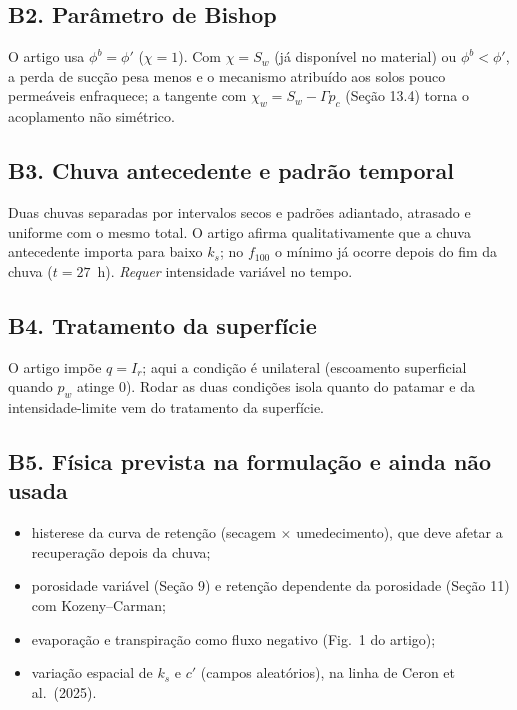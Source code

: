 \subsection{B2. Par\^ametro de Bishop}

O artigo usa $\phi^b=\phi'$ ($\chi=1$). Com $\chi=S_w$ (j\'a dispon\'ivel no material) ou $\phi^b<\phi'$, a perda de
suc\c{c}\~ao pesa menos e o mecanismo atribu\'ido aos solos pouco perme\'aveis enfraquece; a tangente com
$\chi_w=S_w-\Gamma p_c$ (Se\c{c}\~ao 13.4) torna o acoplamento n\~ao sim\'etrico.

\subsection{B3. Chuva antecedente e padr\~ao temporal}

Duas chuvas separadas por intervalos secos e padr\~oes adiantado, atrasado e uniforme com o mesmo total. O artigo
afirma qualitativamente que a chuva antecedente importa para baixo $k_s$; no $f_{100}$ o m\'inimo j\'a ocorre depois
do fim da chuva ($t=27$~h). \emph{Requer} intensidade vari\'avel no tempo.

\subsection{B4. Tratamento da superf\'icie}

O artigo imp\~oe $q=I_r$; aqui a condi\c{c}\~ao \'e unilateral (escoamento superficial quando $p_w$ atinge 0). Rodar as
duas condi\c{c}\~oes isola quanto do patamar e da intensidade-limite vem do tratamento da superf\'icie.

\subsection{B5. F\'isica prevista na formula\c{c}\~ao e ainda n\~ao usada}

\begin{itemize}
\item histerese da curva de reten\c{c}\~ao (secagem $\times$ umedecimento), que deve afetar a recupera\c{c}\~ao depois da
chuva;
\item porosidade vari\'avel (Se\c{c}\~ao 9) e reten\c{c}\~ao dependente da porosidade (Se\c{c}\~ao 11) com
Kozeny--Carman;
\item evapora\c{c}\~ao e transpira\c{c}\~ao como fluxo negativo (Fig.~1 do artigo);
\item varia\c{c}\~ao espacial de $k_s$ e $c'$ (campos aleat\'orios), na linha de Ceron et al.\ (2025).
\end{itemize}

